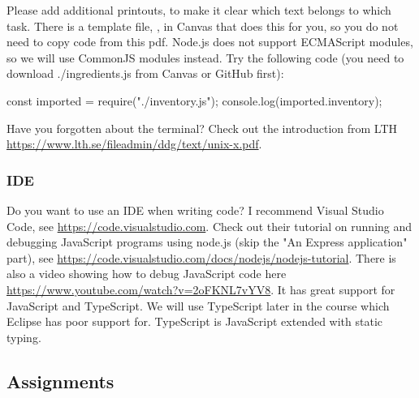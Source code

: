 \documentclass[fleqn, article, a4paper]{memoir}
\begin{document}
\noindent Please add additional printouts, to make it clear which text belongs to which task. There is a template file, , in Canvas that does this for you, so you do not need to copy code from this pdf. Node.js does not support ECMAScript modules, so we will use CommonJS modules instead. Try the following code (you need to download ./ingredients.js from Canvas or GitHub first):
\begin{Code}
  const imported = require("./inventory.js");
  console.log(imported.inventory);
\end{Code}

\noindent Have you forgotten about the terminal? Check out the introduction from LTH \url{https://www.lth.se/fileadmin/ddg/text/unix-x.pdf}.

\subsubsection*{IDE}

\noindent Do you want to use an IDE when writing code? I recommend Visual Studio Code, see \url{https://code.visualstudio.com}. Check out their tutorial on running and debugging JavaScript programs using node.js (skip the "An Express application" part), see \url{https://code.visualstudio.com/docs/nodejs/nodejs-tutorial}. There is also a video showing how to debug JavaScript code here \url{https://www.youtube.com/watch?v=2oFKNL7vYV8}. It has great support for JavaScript and TypeScript. We will use TypeScript later in the course which Eclipse has poor support for. TypeScript is JavaScript extended with static typing.

\subsection*{Assignments}
\end{document}
